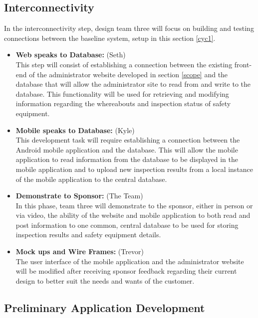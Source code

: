 \documentclass[Letter,11pt]{article}
\begin{document}
	\subsection{Interconnectivity}\label{connect}
		In the interconnectivity step, design team three will focus on building and testing connections between the baseline system, setup in this section \ref{cyc1}.
		\begin{itemize}
			\item\textbf{Web speaks to Database:} (Seth)\\
			This step will consist of establishing a connection between the existing front-end of the administrator website developed in section \ref{scope} and the database that will allow the administrator site to read from and write to the database.  This functionality will be used for retrieving and modifying information regarding the whereabouts and inspection status of safety equipment. 

			
			\item \textbf{Mobile speaks to Database:} (Kyle)\\
			This development task will require establishing a connection between the Android mobile application and the database.  This will allow the mobile application to read information from the database to be displayed in the mobile application and to upload new inspection results from a local instance of the mobile application to the central database.

			\item\textbf{Demonstrate to Sponsor:} (The Team)\\
			 In this phase, team three will demonstrate to the sponsor, either in person or via video, the ability of the website and mobile application to both read and post information to one common, central database to be used for storing inspection results and safety equipment details.

			
			\item\textbf{Mock ups and Wire Frames:} (Trevor)\\
			The user interface of the mobile application and the administrator website will be modified after receiving sponsor feedback regarding their current design to better suit the needs and wants of the customer.
			
			
		\end{itemize}
		
		\subsection{Preliminary Application Development}\label{dev1}
		
\end{document}
